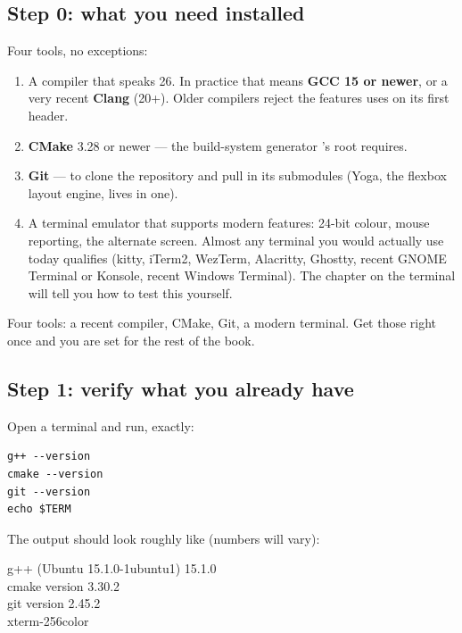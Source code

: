 \subsection{Step 0: what you need installed}

Four tools, no exceptions:

\begin{enumerate}[leftmargin=*]
  \item A \cpp{} compiler that speaks \cpp{}26. In practice that
    means \textbf{GCC 15 or newer}, or a very recent \textbf{Clang}
    (20+). Older compilers reject the features \maya{} uses on its
    first header.
  \item \textbf{CMake} 3.28 or newer --- the build-system generator
    \maya{}'s root  requires.
  \item \textbf{Git} --- to clone the repository and pull in its
    submodules (Yoga, the flexbox layout engine, lives in one).
  \item A terminal emulator that supports modern features: 24-bit
    colour, mouse reporting, the alternate screen. Almost any
    terminal you would actually use today qualifies (kitty,
    iTerm2, WezTerm, Alacritty, Ghostty, recent GNOME Terminal or
    Konsole, recent Windows Terminal). The chapter on the terminal
    will tell you how to test this yourself.
\end{enumerate}

\begin{idea}
Four tools: a recent \cpp{} compiler, CMake, Git, a modern terminal.
Get those right once and you are set for the rest of the book.
\end{idea}

\subsection{Step 1: verify what you already have}

Open a terminal and run, exactly:

\begin{lstlisting}[style=shell]
g++ --version
cmake --version
git --version
echo $TERM
\end{lstlisting}

The output should look roughly like (numbers will vary):

\begin{terminalbox}
g++ (Ubuntu 15.1.0-1ubuntu1) 15.1.0\\
cmake version 3.30.2\\
git version 2.45.2\\
xterm-256color
\end{terminalbox}

